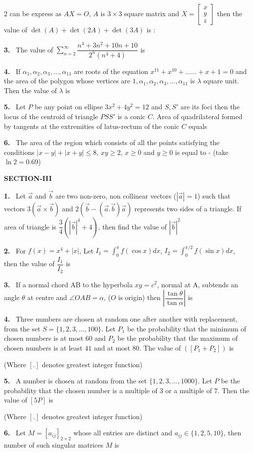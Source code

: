 \documentclass[10pt]{extarticle}
\newcommand{\sect}[1]{\par\smallskip\noindent\textbf{#1}\par}
\newcommand{\qn}[1]{\par\smallskip\noindent\textbf{#1.}~}
\begin{document}
\begin{multicols}{2}
can be express as $AX=O$, $A$ is $3\times3$ square matrix and $X=\begin{bmatrix}x\\y\\z\end{bmatrix}$ then the value of $\det(A)+\det(2A)+\det(3A)$ is :
\qn{3} The value of $\displaystyle\sum_{n=2}^{\infty}\dfrac{n^4+3n^2+10n+10}{2^n(n^4+4)}$ is
\qn{4} If $\alpha_1,\alpha_2,\alpha_3,\ldots,\alpha_{11}$ are roots of the equation $x^{11}+x^{10}+\ldots\ldots+x+1=0$ and the area of the polygon whose vertices are $1,\alpha_1,\alpha_2,\alpha_3,\ldots,\alpha_{11}$ is $\lambda$ square unit. Then the value of $\lambda$ is
\qn{5} Let $P$ be any point on ellipse $3x^2+4y^2=12$ and $S,S'$ are its foci then the locus of the centroid of triangle $PSS'$ is a conic $C$. Area of quadrilateral formed by tangents at the extremities of latus-rectum of the conic $C$ equals
\qn{6} The area of the region which consists of all the points satisfying the conditions $|x-y|+|x+y|\le8$, $xy\ge2$, $x\ge0$ and $y\ge0$ is equal to - (take $\ln2=0.69$)
\sect{SECTION-III}
\qn{1} Let $\vec a$ and $\vec b$ are two non-zero, non collinear vectors ($|\vec a|=1$) such that vectors $3(\vec a\times\vec b)$ and $2(\vec b-(\vec a.\vec b)\vec a)$ represents two sides of a triangle. If area of triangle is $\dfrac34\left(|\vec b|^4+4\right)$, then find the value of $|\vec b|^2$
\qn{2} For $f(x)=x^4+|x|$, Let $I_1=\displaystyle\int_0^{\pi}f(\cos x)dx$, $I_2=\displaystyle\int_0^{\pi/2}f(\sin x)dx$, then the value of $\dfrac{I_1}{I_2}$ is
\qn{3} If a normal chord AB to the hyperbola $xy=c^2$, normal at A, subtends an angle $\theta$ at centre and $\angle OAB=\alpha$, ($O$ is origin) then $\left|\dfrac{\tan\theta}{\tan\alpha}\right|$ is
\qn{4} Three numbers are chosen at random one after another with replacement, from the set $S=\{1,2,3,\ldots,100\}$. Let $P_1$ be the probability that the minimum of chosen numbers is at most $60$ and $P_2$ be the probability that the maximum of chosen numbers is at least $41$ and at most $80$. The value of $([P_1+P_2])$ is \underline{\hspace{0.8cm}}

(Where $[.]$ denotes greatest integer function)
\qn{5} A number is chosen at random from the set $\{1,2,3,\ldots,1000\}$. Let $P$ be the probability that the chosen number is a multiple of $3$ or a multiple of $7$. Then the value of $[5P]$ is \underline{\hspace{0.8cm}}

(Where $[.]$ denotes greatest integer function)
\qn{6} Let $M=[a_{ij}]_{2\times2}$ whose all entries are distinct and $a_{ij}\in\{1,2,5,10\}$, then number of such singular matrices $M$ is
\end{multicols}
\end{document}
